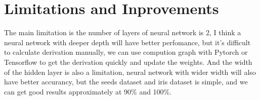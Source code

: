 \documentclass{article}
\begin{document}
\section{Limitations and Inprovements}

The main limitation is the number of layers of neural network is 2, I think a neural network with deeper depth will
have better perfomance, but it's difficult to calculate derivation manually, we can use compution graph with Pytorch 
or Tensorflow to get the derivation quickly and update the weights. And the width of the hidden layer is also a limitation,
neural network with wider width will also have better accurancy, but the seeds dataset and iris dataset is
simple, and we can get good results approximately at 90\% and 100\%.
\end{document}
